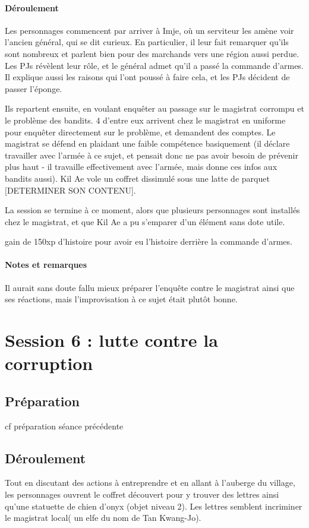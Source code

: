 \documentclass[10pt,a4paper]{book}
\begin{document}
\paragraph{Déroulement}
Les personnages commencent par arriver à Imje, où un serviteur les amène voir l'ancien général, qui se dit curieux. En particulier, il leur fait remarquer qu'ils sont nombreux et parlent bien pour des marchands vers une région aussi perdue. Les PJs révèlent leur rôle, et le général admet qu'il a passé la commande d'armes. Il explique aussi les raisons qui l'ont poussé à faire cela, et les PJs décident de passer l'éponge.

Ils repartent ensuite, en voulant enquêter au passage sur le magistrat corrompu et le problème des bandits. 4 d'entre eux arrivent chez le magistrat en uniforme pour enquêter directement sur le problème, et demandent des comptes. Le magistrat se défend en plaidant une faible compétence basiquement (il déclare travailler avec l'armée à ce sujet, et pensait donc ne pas avoir besoin de prévenir plus haut - il travaille effectivement avec l'armée, mais donne ces infos aux bandits aussi). Kil Ae vole un coffret dissimulé sous une latte de parquet [DETERMINER SON CONTENU]. 

La session se termine à ce moment, alors que plusieurs personnages sont installés chez le magistrat, et que Kil Ae a pu s'emparer d'un élément sans dote utile.

gain de 150xp d'histoire pour avoir eu l'histoire derrière la commande d'armes.
\paragraph{Notes et remarques}
Il aurait sans doute fallu mieux préparer l'enquête contre le magistrat ainsi que ses réactions, mais l'improvisation à ce sujet était plutôt bonne.
\section{Session 6 : lutte contre la corruption}
\subsection{Préparation} cf préparation séance précédente
\subsection{Déroulement}
Tout en discutant des actions à entreprendre et en allant à l'auberge du village, les personnages ouvrent le coffret découvert pour y trouver des lettres ainsi qu'une statuette de chien d'onyx (objet niveau 2). Les lettres semblent incriminer le magistrat local( un elfe du nom de Tan Kwang-Jo).
\end{document}
